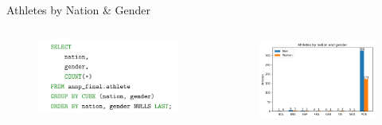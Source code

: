\documentclass[aspectratio=169, xcolor=dvipsnames]{beamer}
\begin{document}
\begin{frame}{Athletes by Nation \& Gender}
\begin{columns}[c]
\begin{column}{.5\textwidth}
\begin{figure}
    \centering
    \includegraphics[width=\textwidth]{img/sql/nationgender.png}
\end{figure}
\end{column}

\begin{column}{.5\textwidth}
\begin{figure}
    \centering
    \includegraphics[width=\textwidth]{img/athletesbynationgender.png}
\end{figure}
\end{column}
\end{columns}
\end{frame}
\end{document}

